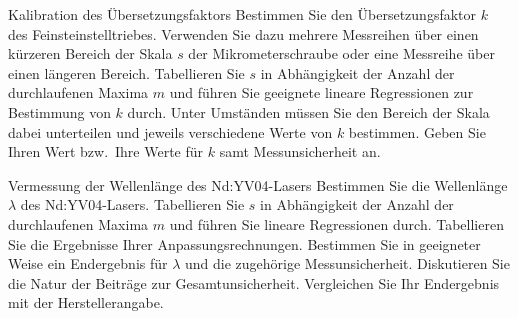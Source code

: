 \begin{aufgabe}{Kalibration des Übersetzungsfaktors}
  Bestimmen Sie den Übersetzungsfaktor $k$ des Feinsteinstelltriebes.
  Verwenden Sie dazu mehrere Messreihen über einen kürzeren Bereich
  der Skala $s$ der Mikrometerschraube oder eine Messreihe über einen
  längeren Bereich. Tabellieren Sie $s$ in Abhängigkeit der Anzahl der
  durchlaufenen Maxima $m$ und führen Sie geeignete lineare
  Regressionen zur Bestimmung von $k$ durch. Unter Umständen müssen
  Sie den Bereich der Skala dabei unterteilen und jeweils verschiedene
  Werte von $k$ bestimmen. Geben Sie Ihren Wert bzw.~Ihre Werte für
  $k$ samt Messunsicherheit an.
\end{aufgabe}


\begin{aufgabe}{Vermessung der Wellenlänge des Nd:YV04-Lasers}
  Bestimmen Sie die Wellenlänge $\lambda$ des
  Nd:YV04-Lasers. Tabellieren Sie $s$ in Abhängigkeit der Anzahl der
  durchlaufenen Maxima $m$ und führen Sie lineare Regressionen
  durch. Tabellieren Sie die Ergebnisse Ihrer
  Anpassungsrechnungen. Bestimmen Sie in geeigneter Weise ein
  Endergebnis für $\lambda$ und die zugehörige
  Messunsicherheit. Diskutieren Sie die Natur der Beiträge zur
  Gesamtunsicherheit. Vergleichen Sie Ihr Endergebnis mit der
  Herstellerangabe.
\end{aufgabe}



